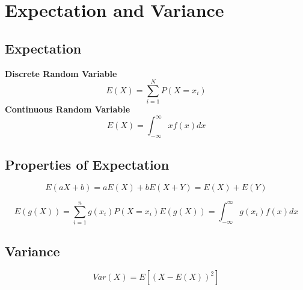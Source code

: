 \section{Expectation and Variance} %
\label{sec:expectation}

\subsection{Expectation} %
\label{sub:expectation}
\textbf{Discrete Random Variable}
\begin{equation}
  E(X) = \sum_{i=1}^N P(X=x_i)
\end{equation}
\textbf{Continuous Random Variable}
\begin{equation}
  E(X) = \int^\infty_{-\infty} xf(x)dx
\end{equation}

\subsection{Properties of Expectation} %
\label{sub:properties_of_expectation}

\begin{subequations}
  \begin{equation}
    E(aX + b) = aE(X) +b
  \end{equation}
  \begin{equation}
    E(X + Y) = E(X) + E(Y)
  \end{equation}
\end{subequations}

\begin{subequations}
  \begin{equation}
    E(g(X)) = \sum_{i=1}^n g(x_i)P(X = x_i)
  \end{equation}
  \begin{equation}
    E(g(X)) = \int^\infty_{-\infty} g(x_i)f(x)dx
  \end{equation}
\end{subequations}

\subsection{Variance} %
\label{sub:variance}
\begin{equation}
  Var(X) = E[(X-E(X))^2]
\end{equation}

